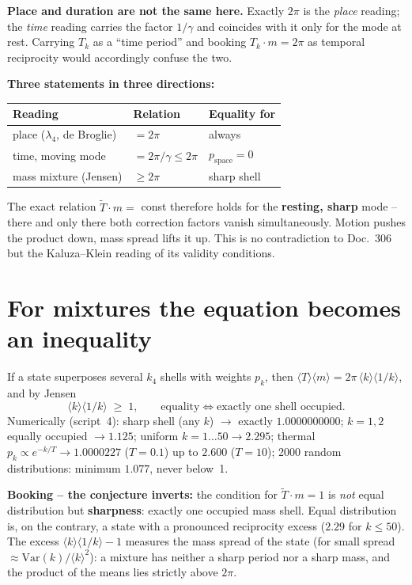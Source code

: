 \textbf{Place and duration are not the same here.} Exactly $2\pi$
is the \emph{place} reading; the \emph{time} reading carries the
factor $1/\gamma$ and coincides with it only for the mode at rest.
Carrying $T_k$ as a \enquote{time period} and booking
$T_k\cdot m = 2\pi$ as temporal reciprocity would accordingly
confuse the two.

\textbf{Three statements in three directions:}
\begin{center}
\begin{tabular}{lll}
\toprule
Reading & Relation & Equality for \\
\midrule
place ($\lambda_4$, de Broglie) & $=2\pi$ & always \\
time, moving mode & $=2\pi/\gamma \le 2\pi$ &
  $p_\text{space} = 0$ \\
mass mixture (Jensen) & $\ge 2\pi$ & sharp shell \\
\bottomrule
\end{tabular}
\end{center}

\noindent The exact relation $\tilde T\cdot m = $ const therefore
holds for the \textbf{resting, sharp} mode -- there and only there
both correction factors vanish simultaneously. Motion pushes the
product down, mass spread lifts it up. This is no contradiction to
Doc.~306 but the Kaluza--Klein reading of its validity
conditions.

\section{For mixtures the equation becomes an inequality}

If a state superposes several $k_4$ shells with weights $p_k$,
then $\langle T\rangle\langle m\rangle =
2\pi\,\langle k\rangle\langle 1/k\rangle$, and by Jensen
\begin{equation}
  \langle k\rangle\langle 1/k\rangle \;\ge\; 1,
  \qquad\text{equality} \iff \text{exactly one shell occupied.}
\end{equation}
Numerically (script~4): sharp shell (any $k$) $\to$ exactly
$1.0000000000$; $k = 1,2$ equally occupied $\to 1.125$; uniform
$k = 1\ldots50 \to 2.295$; thermal
$p_k \propto e^{-k/T} \to 1.0000227$ ($T = 0.1$) up to
$2.600$ ($T = 10$); 2000 random distributions: minimum $1.077$,
never below~1.

\textbf{Booking -- the conjecture inverts:} the condition for
$\tilde T\cdot m = 1$ is \emph{not} equal distribution but
\textbf{sharpness}: exactly one occupied mass shell. Equal
distribution is, on the contrary, a state with a pronounced
reciprocity excess ($2.29$ for $k \le 50$). The excess
$\langle k\rangle\langle 1/k\rangle - 1$ measures the mass
spread of the state (for small spread
$\approx \mathrm{Var}(k)/\langle k\rangle^2$): a mixture has
neither a sharp period nor a sharp mass, and the product of the
means lies strictly above $2\pi$.

